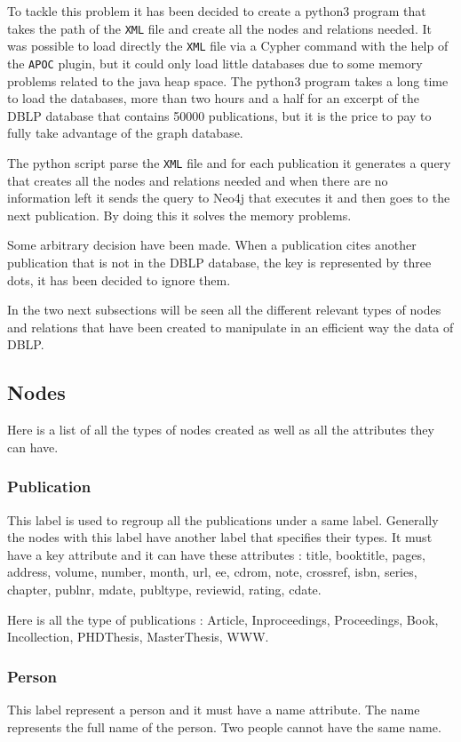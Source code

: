 \documentclass{article}
\begin{document}
To tackle this problem it has been decided to create a python3 program that takes the path of the \texttt{XML} file and create all the nodes and relations needed. It was possible to load directly the \texttt{XML} file via a Cypher command with the help of the \texttt{APOC} plugin, but it could only load little databases due to some memory problems related to the java heap space. The python3 program takes a long time to load the databases, more than two hours and a half for an excerpt of the DBLP database that contains 50000 publications, but it is the price to pay to fully take advantage of the graph database.

The python script parse the \texttt{XML} file and for each publication it generates a query that creates all the nodes and relations needed and when there are no information left it sends the query to Neo4j that executes it and then goes to the next publication. By doing this it solves the memory problems.

Some arbitrary decision have been made. When a publication cites another publication that is not in the DBLP database, the key is represented by three dots, it has been decided to ignore them.

In the two next subsections will be seen all the different relevant types of nodes and relations that have been created to manipulate in an efficient way the data of DBLP.

\subsection{Nodes}
Here is a list of all the types of nodes created as well as all the attributes they can have.

\subsubsection{Publication}
This label is used to regroup all the publications under a same label. Generally the nodes with this label have another label that specifies their types. It must have a key attribute and it can have these attributes : title, booktitle, pages, address, volume, number, month, url, ee, cdrom, note, crossref, isbn, series, chapter, publnr, mdate, publtype, reviewid, rating, cdate.

Here is all the type of publications : Article, Inproceedings, Proceedings, Book, Incollection, PHDThesis, MasterThesis, WWW.

\subsubsection{Person}
This label represent a person and it must have a name attribute. The name represents the full name of the person. Two people cannot have the same name.
\end{document}
